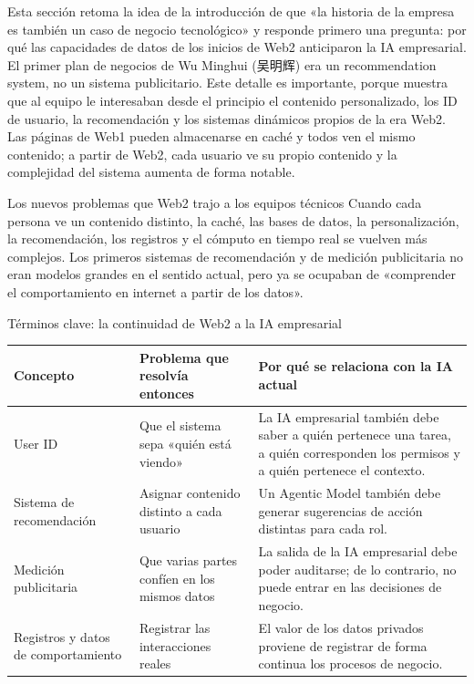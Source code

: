 \documentclass[a4paper]{article}
\begin{document}
Esta sección retoma la idea de la introducción de que «la historia de la empresa es también un caso de negocio tecnológico» y responde primero una pregunta: por qué las capacidades de datos de los inicios de Web2 anticiparon la IA empresarial. El primer plan de negocios de Wu Minghui (吴明辉) era un recommendation system, no un sistema publicitario. Este detalle es importante, porque muestra que al equipo le interesaban desde el principio el contenido personalizado, los ID de usuario, la recomendación y los sistemas dinámicos propios de la era Web2. Las páginas de Web1 pueden almacenarse en caché y todos ven el mismo contenido; a partir de Web2, cada usuario ve su propio contenido y la complejidad del sistema aumenta de forma notable.

\begin{importantbox}{Los nuevos problemas que Web2 trajo a los equipos técnicos}
Cuando cada persona ve un contenido distinto, la caché, las bases de datos, la personalización, la recomendación, los registros y el cómputo en tiempo real se vuelven más complejos. Los primeros sistemas de recomendación y de medición publicitaria no eran modelos grandes en el sentido actual, pero ya se ocupaban de «comprender el comportamiento en internet a partir de los datos».
\end{importantbox}

\begin{knowledgebox}{Términos clave: la continuidad de Web2 a la IA empresarial}
\begin{tabularx}{\textwidth}{p{}p{}X}
\toprule
Concepto & Problema que resolvía entonces & Por qué se relaciona con la IA actual \\
\midrule
User ID & Que el sistema sepa «quién está viendo» & La IA empresarial también debe saber a quién pertenece una tarea, a quién corresponden los permisos y a quién pertenece el contexto. \\
Sistema de recomendación & Asignar contenido distinto a cada usuario & Un Agentic Model también debe generar sugerencias de acción distintas para cada rol. \\
Medición publicitaria & Que varias partes confíen en los mismos datos & La salida de la IA empresarial debe poder auditarse; de lo contrario, no puede entrar en las decisiones de negocio. \\
Registros y datos de comportamiento & Registrar las interacciones reales & El valor de los datos privados proviene de registrar de forma continua los procesos de negocio. \\
\bottomrule
\end{tabularx}
\end{knowledgebox}
\end{document}
